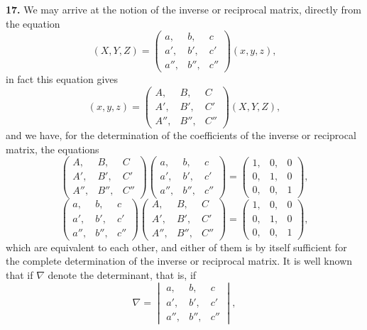\documentclass[11pt,a4paper]{book}
\begin{document}
\begin{center}
\medskip
\noindent\textbf{17.} We may arrive at the notion of the inverse or reciprocal matrix, directly from the equation
\[
(X,Y,Z) = \begin{pmatrix} a, & b, & c \\ a', & b', & c' \\ a'', & b'', & c'' \end{pmatrix}(x,y,z),
\]
in fact this equation gives
\[
(x,y,z) = \begin{pmatrix} A, & B, & C \\ A', & B', & C' \\ A'', & B'', & C'' \end{pmatrix}(X,Y,Z),
\]
and we have, for the determination of the coefficients of the inverse or reciprocal matrix, the equations
\[
\begin{pmatrix} A, & B, & C \\ A', & B', & C' \\ A'', & B'', & C'' \end{pmatrix}
\begin{pmatrix} a, & b, & c \\ a', & b', & c' \\ a'', & b'', & c'' \end{pmatrix}
=
\begin{pmatrix} 1, & 0, & 0 \\ 0, & 1, & 0 \\ 0, & 0, & 1 \end{pmatrix},
\]
\[
\begin{pmatrix} a, & b, & c \\ a', & b', & c' \\ a'', & b'', & c'' \end{pmatrix}
\begin{pmatrix} A, & B, & C \\ A', & B', & C' \\ A'', & B'', & C'' \end{pmatrix}
=
\begin{pmatrix} 1, & 0, & 0 \\ 0, & 1, & 0 \\ 0, & 0, & 1 \end{pmatrix},
\]
which are equivalent to each other, and either of them is by itself sufficient for the complete determination of the inverse or reciprocal matrix. It is well known that if $\nabla$ denote the determinant, that is, if
\[
\nabla = \begin{vmatrix} a, & b, & c \\ a', & b', & c' \\ a'', & b'', & c'' \end{vmatrix},
\]
\end{center}
\end{document}

